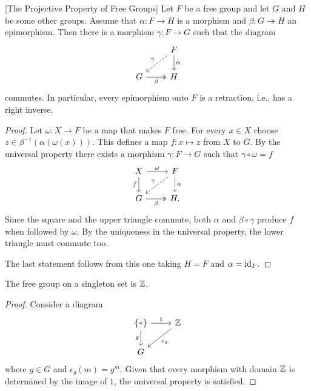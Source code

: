 \begin{thm} \textrm{\rm[The Projective Property of Free Groups]}
    Let\/ $F$ be a free group and let\/ $G$ and\/ $H$ be some other groups. Assume that\/ $\alpha\colon F \to H$ is a morphism and\/ $\beta\colon G \twoheadrightarrow H$ an epimorphism. Then there is a morphism\/ $\gamma\colon F \to G$ such that the diagram
    $$
\begin{tikzcd}
        & F
            \arrow[d,"\alpha"]
            \arrow[ld,"\gamma"',dashed]\\
    G
        \arrow[r,"\beta"',two heads]
        &H
\end{tikzcd}
    $$
    commutes. In particular, every epimorphism onto $F$ is a retraction, i.e., has a right inverse.
\end{thm}

\begin{proof}
    Let $\omega\colon X\to F$ be a map that makes $F$ free. For every $x\in X$ choose $z\in\beta^{-1}(\alpha(\omega(x)))$. This defines a map $f\colon x\mapsto z$ from $X$ to $G$. By the universal property there exists a morphism $\gamma\colon F\to G$ such that $\gamma\circ\omega=f$
    $$
        \begin{tikzcd}
            X
                    \arrow[d,"f"']
                    \arrow[r,"\omega"]
                &F
                    \arrow[d,"\alpha"]
                    \arrow[ld,"\gamma"',dashed]\\
            G
                    \arrow[r,"\beta"',two heads]
                &H.
        \end{tikzcd}
    $$
    Since the square and the upper triangle commute, both $\alpha$ and $\beta\circ\gamma$ produce $f$ when followed by $\omega$. By the uniqueness in the universal property, the lower triangle must commute too.

    The last statement follows from this one taking $H=F$ and $\alpha=\operatorname{id}_F$.
\end{proof}

\begin{prop}
    The free group on a singleton set is\/ $\mathbb{Z}$.
\end{prop}

\begin{proof}
    Consider a diagram 
    $$
        \begin{tikzcd}
            \set\ast\arrow[r,"1"]\arrow[d,"g"']
                &\Z\arrow[ld,"\epsilon_g"]\\
            G
        \end{tikzcd}
    $$
    where $g\in G$ and $\epsilon_g(m)=g^m$. Given that every morphism with domain $\mathbb{Z}$ is determined by the image of $1$, the universal property is satisfied.
\end{proof}

